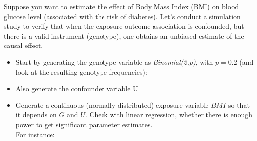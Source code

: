 \documentclass[
]{book}
\newenvironment{Shaded}{\begin{snugshade}}{\end{snugshade}}
\newcommand{\AttributeTok}[1]{\textcolor[rgb]{0.13,0.29,0.53}{#1}}
\newcommand{\DecValTok}[1]{\textcolor[rgb]{0.00,0.00,0.81}{#1}}
\newcommand{\FloatTok}[1]{\textcolor[rgb]{0.00,0.00,0.81}{#1}}
\newcommand{\FunctionTok}[1]{\textcolor[rgb]{0.13,0.29,0.53}{\textbf{#1}}}
\newcommand{\NormalTok}[1]{#1}
\newcommand{\OtherTok}[1]{\textcolor[rgb]{0.56,0.35,0.01}{#1}}
\newcommand{\SpecialCharTok}[1]{\textcolor[rgb]{0.81,0.36,0.00}{\textbf{#1}}}
\providecommand{\tightlist}{%
  \setlength{\itemsep}{0pt}\setlength{\parskip}{0pt}}
\begin{document}
Suppose you want to estimate the effect of Body Mass Index (BMI) on blood glucose level (associated with the risk of diabetes).
Let's conduct a simulation study to verify that when the exposure-outcome association is confounded, but there is a valid instrument (genotype), one obtains an unbiased estimate of the causal effect.

\begin{itemize}
\tightlist
\item
  Start by generating the genotype variable as \emph{Binomial(2,p)}, with \(p=0.2\) (and look at the resulting genotype frequencies):
\end{itemize}

\begin{Shaded}
\end{Shaded}

\begin{itemize}
\tightlist
\item
  Also generate the confounder variable U
\end{itemize}

\begin{Shaded}
\end{Shaded}

\begin{itemize}
\tightlist
\item
  Generate a continuous (normally distributed) exposure variable \(BMI\) so that it depends on \(G\) and \(U\).
  Check with linear regression, whether there is enough power to get significant parameter estimates.\\
  For instance:
\end{itemize}

\begin{Shaded}
\end{Shaded}
\end{document}
